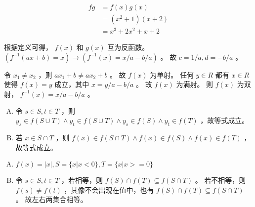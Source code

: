 {{\begin{practices}
            \begin{align*}
                fg
                &= f(x)g(x) \\
                &= (x^2 + 1)(x + 2) \\
                &= x^3 + 2x^2 + x + 2
            \end{align*}
        \end{practices}

        \begin{practices}
            根据定义可得， $f(x)$ 和 $g(x)$ 互为反函数。
            $(f^{-1}(ax + b) = x) \rightarrow (f^{-1}(x) = x / a - b / a)$ 。
            故 $c = 1 / a, d = - b / a$ 。
        \end{practices}

        \begin{practices}
            令 $x_1 \neq x_2$ ，则 $ax_1 + b \neq ax_2 + b$ 。
            故 $f(x)$ 为单射。
            任何 $y \in R$ 都有 $x \in R$ 使得 $f(x) = y$ 成立，其中 $x = y / a - b / a$ 。
            故 $f(x)$ 为满射。
            则 $f(x)$ 为双射， $f^{-1}(x) = x / a - b / a$ 。
        \end{practices}

        \begin{practices}
            \begin{enumerate}[A.]
                \item
                {
                    令 $s \in S, t \in T$ ，则 $y_s \in f(S \cup T) \wedge y_t \in f(S \cup T) \wedge y_s \in f(S) \wedge y_t \in f(T)$ ，故等式成立。
                }
                \item
                {
                    若 $x \in S \cap T$ ，则 $f(x) \in f(S \cap T) \wedge f(x) \in f(S) \wedge f(x) \in f(T)$ ，故等式成立。
                }
            \end{enumerate}
        \end{practices}

        \begin{practices}
            \begin{enumerate}[A.]
                \item
                {
                    $f(x) = |x|, S = \{x | x < 0\}, T = \{x | x >= 0\}$
                }
                \item
                {
                    令 $s \in S, t \in T$ ，若相等，则 $f(S) \cap f(T) \subseteq f(S \cap T)$ 。
                    若不相等，则 $f(s) \neq f(t)$ ，其像不会出现在值中，也有 $f(S) \cap f(T) \subseteq f(S \cap T)$ 。
                    故左右两集合相等。
                }
            \end{enumerate}
        \end{practices}

}}

